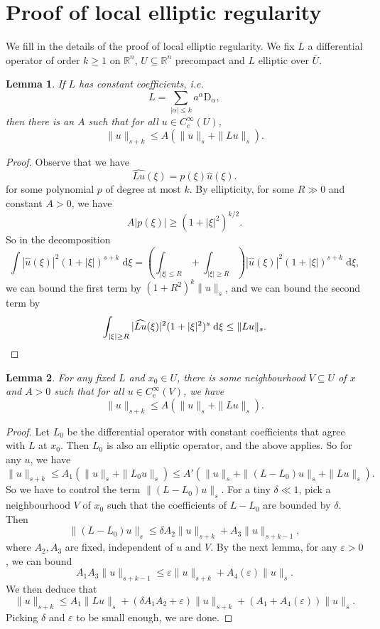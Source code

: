 \documentclass{shortart}
\newtheorem*{lemma}{Lemma}
\theoremstyle{definition}
\newcommand\R{\mathbb{R}}
\newcommand\der{\mathrm{d}}
\newcommand\D{\mathrm{D}}
\begin{document}
\appendices
\section{Proof of local elliptic regularity}
We fill in the details of the proof of local elliptic regularity. We fix $L$ a differential operator of order $k \geq 1$ on $\R^n$, $U \subseteq \R^n$ precompact and $L$ elliptic over $\bar{U}$.
\begin{lemma}
  If $L$ has constant coefficients, i.e.
  \[
    L = \sum_{|\alpha| \leq k} a^\alpha \D_\alpha,
  \]
  then there is an $A$ such that for all $u \in C_c^\infty(U)$,
  \[
    \|u\|_{s + k} \leq A(\|u\|_s + \|Lu\|_{s}).
  \]
\end{lemma}

\begin{proof}
  Observe that we have
  \[
    \widehat{Lu}(\xi) = p(\xi) \hat{u}(\xi).
  \]
  for some polynomial $p$ of degree at most $k$. By ellipticity, for some $R \gg 0$ and constant $A > 0$, we have
  \[
    A |p(\xi)| \geq (1 + |\xi|^2)^{k/2}.
  \]
  So in the decomposition
  \[
    \int |\hat{u}(\xi)|^2 (1 + |\xi|)^{s + k} \;\der \xi = \left(\int_{|\xi| \leq R} + \int_{|\xi| \geq R}\right) |\hat{u}(\xi)|^2 (1 + |\xi|)^{s + k} \;\der \xi,
  \]
  we can bound the first term by $(1 + R^2)^k \|u\|_s$, and we can bound the second term by
  \[
    \int_{|\xi|\geq R} |\widehat{Lu}(\xi)|^2 (1 + |\xi|^2)^s\;\der \xi  \leq \|Lu\|_s.\qedhere
  \]
\end{proof}

\begin{lemma}
  For any fixed $L$ and $x_0 \in U$, there is some neighbourhood $V \subseteq U$ of $x$ and $A > 0$ such that for all $u \in C_c^\infty(V)$, we have
  \[
    \|u\|_{s + k} \leq A(\|u\|_s + \|Lu\|_{s}).
  \]
\end{lemma}

\begin{proof}
  Let $L_0$ be the differential operator with constant coefficients that agree with $L$ at $x_0$. Then $L_0$ is also an elliptic operator, and the above applies. So for any $u$, we have
  \[
    \|u\|_{s + k} \leq A_1(\|u\|_s + \|L_0u\|_s) \leq A'(\|u\|_s + \|(L - L_0) u\|_s + \|Lu\|_s).
  \]
  So we have to control the term $\|(L - L_0)u\|_s$. For a tiny $\delta \ll 1$, pick a neighbourhood $V$ of $x_0$ such that the coefficients of $L - L_0$ are bounded by $\delta$. Then
  \[
    \|(L - L_0)u\|_s \leq \delta A_2 \|u\|_{s + k} + A_3 \|u\|_{s + k- 1},
  \]
  where $A_2, A_3$ are fixed, independent of $u$ and $V$. By the next lemma, for any $\varepsilon > 0$, we can bound
  \[
    A_1 A_3 \|u\|_{s + k - 1} \leq \varepsilon \|u\|_{s + k} + A_4(\varepsilon) \|u\|_s.
  \]
  We then deduce that
  \[
    \|u\|_{s + k} \leq A_1 \|Lu\|_s + (\delta A_1 A_2 + \varepsilon) \|u\|_{s + k} + (A_1 + A_4(\varepsilon)) \|u\|_s.
  \]
  Picking $\delta$ and $\varepsilon$ to be small enough, we are done.
\end{proof}
\end{document}
